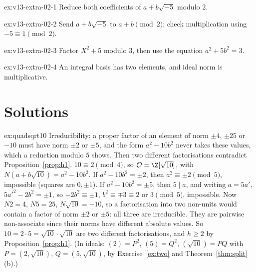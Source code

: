 \begin{hint}{ex:v13-extra-02-1}
Reduce both coefficients of $a+b\sqrt{-5}$ modulo $2$.
\end{hint}

\begin{hint}{ex:v13-extra-02-2}
Send $a+b\sqrt{-5}$ to $a+b\pmod2$; check multiplication using $-5\equiv1\pmod2$.
\end{hint}

\begin{hint}{ex:v13-extra-02-3}
Factor $X^2+5$ modulo $3$, then use the equation $a^2+5b^2=3$.
\end{hint}

\begin{hint}{ex:v13-extra-02-4}
An integral basis has two elements, and ideal norm is multiplicative.
\end{hint}

\section{Solutions}

\begin{solution}{ex:quadsqrt10}
\idea Irreducibility: a proper factor of an element of norm $\pm4$, $\pm25$ or $-10$ must have norm $\pm2$ or $\pm5$, and the form $a^2-10b^2$ never takes these values, which a reduction modulo $5$ shows. Then two different factorisations contradict Proposition~\ref{prop:h1}.
\writeup $10\equiv2\pmod4$, so $\mathcal O=\Z[\sqrt{10}]$, with $N(a+b\sqrt{10})=a^2-10b^2$. If $a^2-10b^2=\pm2$, then $a^2\equiv\pm2\pmod5$, impossible (squares are $0,\pm1$). If $a^2-10b^2=\pm5$, then $5\mid a$, and writing $a=5a'$, $5a'^2-2b^2=\pm1$, so $-2b^2\equiv\pm1$, $b^2\equiv\mp3\equiv2$ or $3\pmod5$, impossible. Now $N2=4$, $N5=25$, $N\sqrt{10}=-10$, so a factorisation into two non-units would contain a factor of norm $\pm2$ or $\pm5$: all three are irreducible. They are pairwise non-associate since their norms have different absolute values. So $10=2\cdot5=\sqrt{10}\cdot\sqrt{10}$ are two different factorisations, and $h\ge2$ by Proposition~\ref{prop:h1}. (In ideals: $(2)=P^2$, $(5)=Q^2$, $(\sqrt{10})=PQ$ with $P=(2,\sqrt{10})$, $Q=(5,\sqrt{10})$, by Exercise~\ref{ex:two} and Theorem~\ref{thm:split}(b).)
\end{solution}

